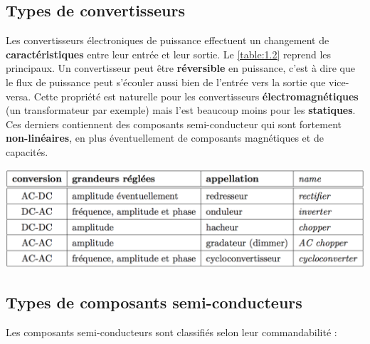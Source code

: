 	\subsection{Types de convertisseurs}
		Les convertisseurs électroniques de puissance effectuent un changement de \textbf{caractéristiques} entre leur entrée et leur sortie. Le \autoref{table:1.2} reprend les principaux. Un convertisseur peut être \textbf{réversible} en puissance, c'est à dire que le flux de puissance peut s'écouler aussi bien de l'entrée vers la sortie que vice-versa. Cette propriété est naturelle pour les convertisseurs \textbf{électromagnétiques} (un transformateur par exemple) mais l'est beaucoup moins pour les \textbf{statiques}. Ces derniers contiennent des composants semi-conducteur qui sont fortement \textbf{non-linéaires}, en plus éventuellement de composants magnétiques et de capacités. 
		
		\begin{center}
			\includegraphics[scale=0.5]{ch1/2}
			\label{table:1.2}
		\end{center}
		
	\subsection{Types de composants semi-conducteurs}
		Les composants semi-conducteurs sont classifiés selon leur commandabilité : 
		
